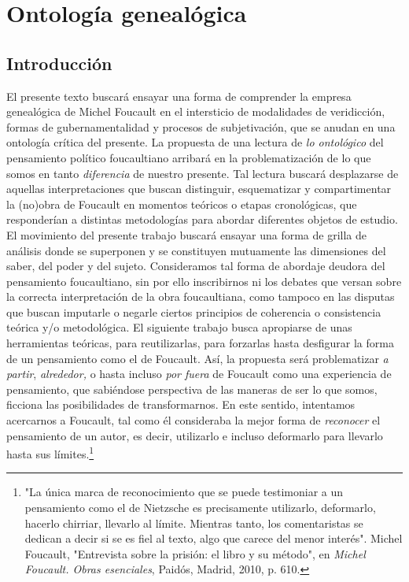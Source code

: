 \documentclass{book}
\begin{document}
\chapter{Ontología genealógica}
\author{María Aurora Romero}

\section{Introducción}

El presente texto buscará ensayar una forma de comprender la empresa
genealógica de Michel Foucault en el intersticio de modalidades de
veridicción, formas de gubernamentalidad y procesos de subjetivación,
que se anudan en una ontología crítica del presente. La propuesta de una
lectura de \emph{lo ontológico} del pensamiento político foucaultiano
arribará en la problematización de lo que somos en tanto
\emph{diferencia} de nuestro presente. Tal lectura buscará desplazarse
de aquellas interpretaciones que buscan distinguir, esquematizar y
compartimentar la (no)obra de Foucault en momentos teóricos o etapas
cronológicas, que responderían a distintas metodologías para abordar
diferentes objetos de estudio. El movimiento del presente trabajo
buscará ensayar una forma de grilla de análisis donde se superponen y se
constituyen mutuamente las dimensiones del saber, del poder y del
sujeto. Consideramos tal forma de abordaje deudora del pensamiento
foucaultiano, sin por ello inscribirnos ni los debates que versan sobre
la correcta interpretación de la obra foucaultiana, como tampoco en las
disputas que buscan imputarle o negarle ciertos principios de coherencia
o consistencia teórica y/o metodológica. El siguiente trabajo busca
apropiarse de unas herramientas teóricas, para reutilizarlas, para
forzarlas hasta desfigurar la forma de un pensamiento como el de
Foucault. Así, la propuesta será problematizar \emph{a partir},
\emph{alrededor,} o hasta incluso \emph{por fuera} de Foucault como una
experiencia de pensamiento, que sabiéndose perspectiva de las maneras de
ser lo que somos, ficciona las posibilidades de transformarnos. En este
sentido, intentamos acercarnos a Foucault, tal como él consideraba la
mejor forma de \emph{reconocer} el pensamiento de un autor, es decir,
utilizarlo e incluso deformarlo para llevarlo hasta sus
límites.\footnote{"La única marca de reconocimiento que se puede
  testimoniar a un pensamiento como el de Nietzsche es precisamente
  utilizarlo, deformarlo, hacerlo chirriar, llevarlo al límite. Mientras
  tanto, los comentaristas se dedican a decir si se es fiel al texto,
  algo que carece del menor interés". Michel Foucault, "Entrevista sobre
  la prisión: el libro y su método", en \emph{Michel Foucault. Obras
  esenciales}, Paidós, Madrid, 2010, p. 610.}
\end{document}
